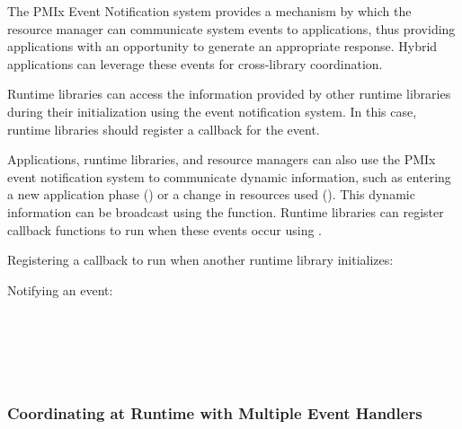 The PMIx Event Notification system provides a mechanism by which the resource manager can communicate system events to applications, thus providing applications with an opportunity to generate an appropriate response. Hybrid applications can leverage these events for cross-library coordination.

Runtime libraries can access the information provided by other runtime libraries during their initialization using the event notification system.  In this case, runtime libraries should register a callback for the  event.

Applications, runtime libraries, and resource managers can also use the PMIx event notification system to communicate dynamic information, such as entering a new application phase () or a change in resources used (). This dynamic information can be broadcast using the  function. Runtime libraries can register callback functions to run when these events occur using .


Registering a callback to run when another runtime library initializes:


Notifying an event:


{\large {}}

{\large {}}

{\large {}}


 \\
 \\
 \\
 \\


\subsubsection{Coordinating at Runtime with Multiple Event Handlers}

